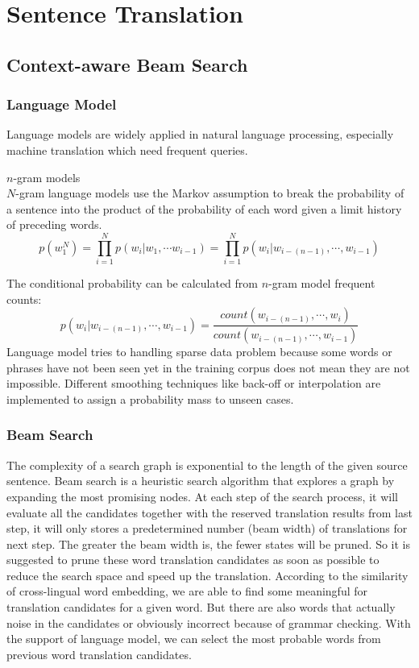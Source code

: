 \chapter{Sentence Translation}
\section{Context-aware Beam Search}
	\subsection{Language Model}
		Language models are widely applied in natural language processing, especially machine translation which need frequent queries. 
		
		${n}$-gram models\\
		${N}$-gram language models use the Markov assumption to break the probability of a sentence into the product of the probability of each word given a limit history of preceding words.
		\[ p(w_1^N) = \prod_{i=1}^{N} p(w_i| w_1, \cdots	w_{i-1}) = \prod_{i=1}^N {p(w_i | w_{i-(n-1)}, \cdots , w_{i-1})}  \] 
		
		The conditional probability can be calculated from ${n}$-gram model frequent counts:
		\[p(w_i | w_{i-(n-1)}, \cdots , w_{i-1}) = \frac{count(w_{i-(n-1)}, \cdots, w_i)}{count(w_{i-(n-1)}, \cdots, w_{i-1})} \]
		Language model tries to handling sparse data problem because some words or phrases have not been seen yet in the training corpus does not mean they are not impossible. Different smoothing techniques like back-off or interpolation are implemented to assign a probability mass to unseen cases.
	\subsection{Beam Search}
	The complexity of a search graph is exponential to the length of the given source sentence. Beam search is a heuristic search algorithm that explores a graph by expanding the most promising nodes. At each step of the search process, it will evaluate all the candidates together with the reserved translation results from last step, it will only stores a predetermined number (beam width) of translations for next step. The greater the beam width is, the fewer states will be pruned. 	
	So it is suggested to prune these word translation candidates as soon as possible to reduce the search space and speed up the translation. According to the similarity of cross-lingual word embedding, we are able to find some meaningful for translation candidates for a given word. But there are also words that actually noise in the candidates or obviously incorrect because of grammar checking. With the support of language model, we can select the most probable words from previous word translation candidates.
	
